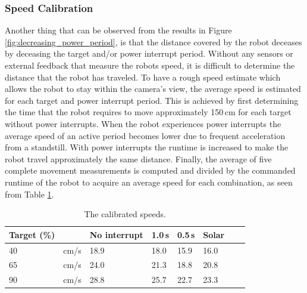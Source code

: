 \subsubsection{Speed Calibration}
Another thing that can be observed from the results in Figure \ref{fig:decreasing_power_period}, is that the distance covered by the robot deceases by deceasing the target and/or power interrupt period.
Without any sensors or external feedback that measure the robots speed, it is difficult to determine the distance that the robot has traveled.
To have a rough speed estimate which allows the robot to stay within the camera's view, the average speed is estimated for each target and power interrupt period.
This is achieved by first determining the time that the robot requires to move approximately 150\,cm for each target without power interrupts.
When the robot experiences power interrupts the average speed of an active period becomes lower due to frequent acceleration from a standstill.
With power interrupts the runtime is increased to make the robot travel approximately the same distance.
Finally, the average of five complete movement measurements is computed and divided by the commanded runtime of the robot to acquire an average speed for each combination, as seen from Table \ref{tab:val_calib}.


\begin{table}[t]
	\centering
	\small
	\caption{The calibrated speeds.}
	\label{tab:val_calib}
	\begin{tabular}{|l|l||l|l|l|l|l|l|}
		\hline
		Target (\%) & & No interrupt & 1.0\,s & 0.5\,s & Solar \\
		\hline \hline
		 40 & cm/s & 18.9 & 18.0 & 15.9 & 16.0\\
	     65 & cm/s & 24.0 & 21.3 & 18.8 & 20.8\\
		 90 & cm/s & 28.8 & 25.7 & 22.7 & 23.3 \\
		\hline
	\end{tabular}
\end{table}


